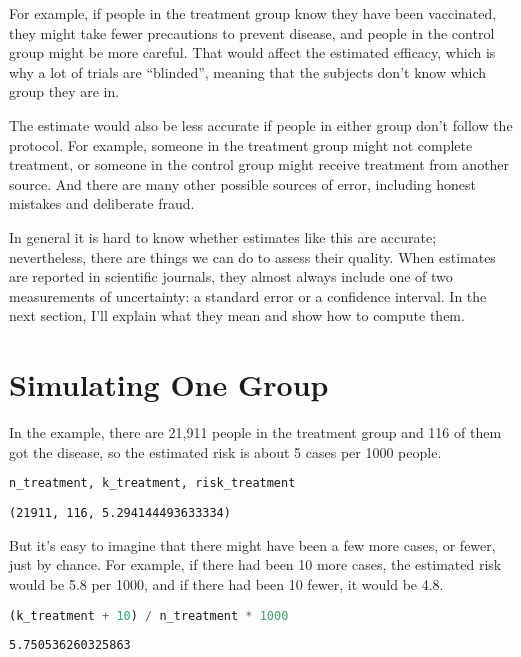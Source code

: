 For example, if people in the treatment group know they have been
vaccinated, they might take fewer precautions to prevent disease, and
people in the control group might be more careful. That would affect the
estimated efficacy, which is why a lot of trials are ``blinded'',
meaning that the subjects don't know which group they are in.

The estimate would also be less accurate if people in either group don't
follow the protocol. For example, someone in the treatment group might
not complete treatment, or someone in the control group might receive
treatment from another source. And there are many other possible sources
of error, including honest mistakes and deliberate fraud.

In general it is hard to know whether estimates like this are accurate;
nevertheless, there are things we can do to assess their quality. When
estimates are reported in scientific journals, they almost always
include one of two measurements of uncertainty: a standard error or a
confidence interval. In the next section, I'll explain what they mean
and show how to compute them.

\section{Simulating One Group}\label{simulating-one-group}

In the example, there are 21,911 people in the treatment group and 116
of them got the disease, so the estimated risk is about 5 cases per 1000
people.

\begin{lstlisting}[language=Python,style=source]
n_treatment, k_treatment, risk_treatment
\end{lstlisting}

\begin{lstlisting}[style=output]
(21911, 116, 5.294144493633334)
\end{lstlisting}

But it's easy to imagine that there might have been a few more cases, or
fewer, just by chance. For example, if there had been 10 more cases, the
estimated risk would be 5.8 per 1000, and if there had been 10 fewer, it
would be 4.8.

\begin{lstlisting}[language=Python,style=source]
(k_treatment + 10) / n_treatment * 1000
\end{lstlisting}

\begin{lstlisting}[style=output]
5.750536260325863
\end{lstlisting}

